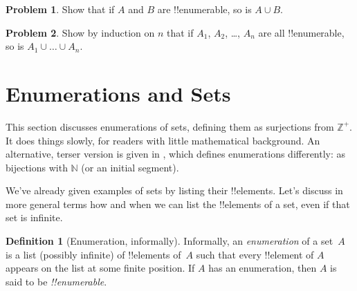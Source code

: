 \documentclass[10pt,a4paper]{article}
\makeatletter
\theoremstyle{plain}
\theoremstyle{definition}
\newtheorem{defn}[thm]{Definition}
\newtheorem{prob}{Problem}[section]
\theoremstyle{remark}
\newenvironment{explain}{}{}
\newenvironment{editorial}{}{}
\newcommand*{\olfileid}[3]{}
\newcommand*{\olsection}[1]{\section*{#1}}
\newcommand{\olref}{\@ifnextchar[{\olref@i}{\olref@final}}
\def\olref@i[#1]{\@ifnextchar[{\olref@ii}{\olref@final}}
\def\olref@ii[#1]{\@ifnextchar[{\olref@iii}{\olref@final}}
\def\olref@iii[#1]{\olref@final}
\def\olref@final#1{\ref{#1}}
\providecommand{\Nat}{\ensuremath{\mathbb{N}}}
\providecommand{\PosInt}{\mathbb{Z}^{+}}
\makeatother
\begin{document}
\begin{prob}
Show that if $A$ and $B$ are !!{enumerable}, so is $A \cup B$.
\end{prob}

\begin{prob}
Show by induction on $n$ that if $A_1$, $A_2$, \dots, $A_n$ are all
!!{enumerable}, so is $A_1 \cup \dots \cup A_n$.
\end{prob}




\olfileid{sfr}{siz}{enm}

\olsection{Enumerations and  Sets}

\begin{editorial}
  This section discusses enumerations of sets, defining them as
  surjections from $\PosInt$. It does things slowly, for readers with
  little mathematical background. An alternative, terser
  version is given in \olref[enm-alt]{sec}, which defines enumerations
  differently: as bijections with $\Nat$ (or an initial segment).
\end{editorial}

\begin{explain}
We've already given examples of sets by listing their !!{element}s.
Let's discuss in more general terms how and when we can list the
!!{element}s of a set, even if that set is infinite.
\end{explain}

\begin{defn}[Enumeration, informally]
Informally, an \emph{enumeration} of a set~$A$ is a list (possibly
infinite) of !!{element}s of~$A$ such that every !!{element} of $A$
appears on the list at some finite position. If $A$ has an
enumeration, then $A$ is said to be \emph{!!{enumerable}}.
\end{defn}
\end{document}
